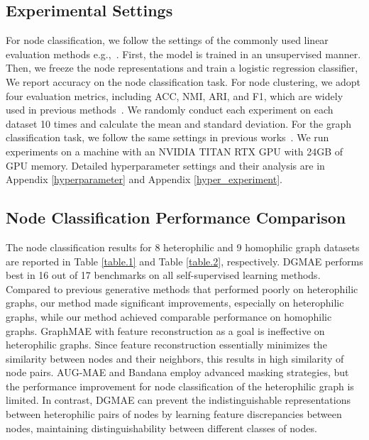 \documentclass[sigconf]{acmart}
\begin{document}

\subsection{Experimental Settings}
\label{Experiment set}
For node classification, we follow the settings of the commonly used linear evaluation methods e.g.,~\cite{dgi}. First, the model is trained in an unsupervised manner. Then, we freeze the node representations and train a logistic regression classifier, We report accuracy on the node classification task. For node clustering, we adopt four evaluation metrics, including ACC, NMI, ARI, and F1, which are widely used in previous methods~\cite{cluster,DCRN,liuyue_deep_graph_clustering_survey,RGC}. We randomly conduct each experiment on each dataset 10 times and calculate the mean and standard deviation. For the graph classification task, we follow the same settings in previous works~\cite{s2gae,graphmae,augmae}. We run experiments on a machine with an NVIDIA TITAN RTX GPU with 24GB of GPU memory. Detailed hyperparameter settings and their analysis are in Appendix \ref{hyperparameter} and Appendix \ref{hyper_experiment}.



\subsection{Node Classification Performance Comparison}
The node classification results for 8 heterophilic and 9 homophilic graph datasets are reported in Table \ref{table.1} and Table \ref{table.2}, respectively. DGMAE performs best in 16 out of 17 benchmarks on all self-supervised learning methods. Compared to previous generative methods that performed poorly on heterophilic graphs, our method made significant improvements, especially on heterophilic graphs, while our method achieved comparable performance on homophilic graphs. GraphMAE with feature reconstruction as a goal is ineffective on heterophilic graphs. Since feature reconstruction essentially minimizes the similarity between nodes and their neighbors, this results in high similarity of node pairs. AUG-MAE and Bandana employ advanced masking strategies, but the performance improvement for node classification of the heterophilic graph is limited. In contrast, DGMAE can prevent the indistinguishable representations between heterophilic pairs of nodes by learning feature discrepancies between nodes, maintaining distinguishability between different classes of nodes.
\end{document}

